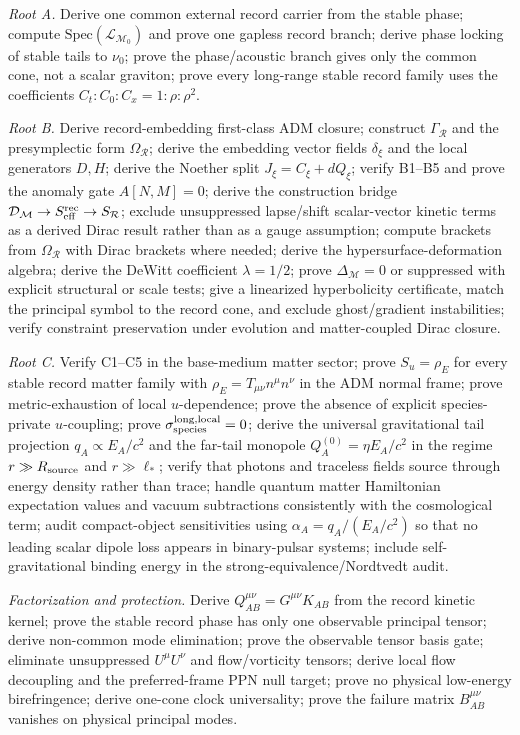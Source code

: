 \documentclass[11pt]{article}
\begin{document}
\medskip\noindent\textit{Root A.}
Derive one common external record carrier from the stable phase; compute
$\mathrm{Spec}(\mathcal L_{\mathcal M_0})$ and prove one gapless record
branch; derive phase locking of stable tails to $\nu_0$; prove the
phase/acoustic branch gives only the common cone, not a scalar graviton;
prove every long-range stable record family uses the coefficients
$C_t:C_0:C_x=1:\rho:\rho^2$.

\medskip\noindent\textit{Root B.}
Derive record-embedding first-class ADM closure; construct $\Gamma_{\mathcal R}$
and the presymplectic form $\Omega_{\mathcal R}$; derive the embedding vector
fields $\delta_\xi$ and the local generators $D,H$; derive the Noether split
$J_\xi=C_\xi+dQ_\xi$; verify B1--B5 and prove the anomaly gate $A[N,M]=0$;
derive the construction bridge
$\mathcal D_{\mathcal M}\to S_{\rm eff}^{\rm rec}\to S_{\mathcal R}$;
exclude unsuppressed lapse/shift scalar-vector kinetic terms as a derived
Dirac result rather than as a gauge assumption; compute brackets from
$\Omega_{\mathcal R}$ with Dirac brackets where needed; derive the
hypersurface-deformation algebra; derive the DeWitt coefficient $\lambda=1/2$;
prove $\Delta_{\mathcal M}=0$ or suppressed with explicit structural or scale
tests; give a linearized hyperbolicity certificate, match the principal symbol
to the record cone, and exclude ghost/gradient instabilities; verify
constraint preservation under evolution and matter-coupled Dirac closure.

\medskip\noindent\textit{Root C.}
Verify C1--C5 in the base-medium matter sector; prove $S_u=\rho_E$ for every
stable record matter family with \(\rho_E=T_{\mu\nu}n^\mu n^\nu\) in the ADM
normal frame; prove metric-exhaustion of local $u$-dependence; prove the
absence of explicit species-private $u$-coupling; prove
$\sigma_{\rm species}^{\rm long,local}=0$; derive the universal gravitational
tail projection $q_A\propto E_A/c^2$ and the far-tail monopole
$Q_A^{(0)}=\eta E_A/c^2$ in the regime \(r\gg R_{\rm source}\) and
\(r\gg\ell_*\); verify that photons and traceless fields source through energy
density rather than trace; handle quantum matter Hamiltonian expectation
values and vacuum subtractions consistently with the cosmological term; audit
compact-object sensitivities using
\(\alpha_A=q_A/(E_A/c^2)\) so that no leading scalar dipole loss appears in
binary-pulsar systems; include self-gravitational binding energy in the
strong-equivalence/Nordtvedt audit.

\medskip\noindent\textit{Factorization and protection.}
Derive $Q_{AB}^{\mu\nu}=G^{\mu\nu}K_{AB}$ from the record kinetic kernel;
prove the stable record phase has only one observable principal tensor; derive
non-common mode elimination; prove the observable tensor basis gate; eliminate
unsuppressed $U^\mu U^\nu$ and flow/vorticity tensors; derive local flow
decoupling and the preferred-frame PPN null target; prove no physical
low-energy birefringence; derive one-cone clock universality; prove the
failure matrix $B_{AB}^{\mu\nu}$ vanishes on physical principal modes.
\end{document}
